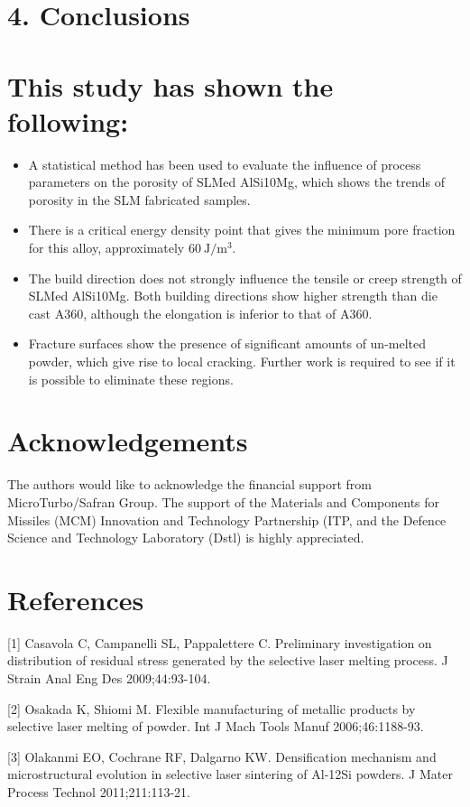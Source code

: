 \documentclass[10pt]{article}
\begin{document}
\section*{4. Conclusions}
\section*{This study has shown the following:}
\begin{itemize}
  \item A statistical method has been used to evaluate the influence of process parameters on the porosity of SLMed AlSi10Mg, which shows the trends of porosity in the SLM fabricated samples.
  \item There is a critical energy density point that gives the minimum pore fraction for this alloy, approximately $60 \mathrm{~J} / \mathrm{m}^{3}$.
  \item The build direction does not strongly influence the tensile or creep strength of SLMed AlSi10Mg. Both building directions show higher strength than die cast A360, although the elongation is inferior to that of A360.
  \item Fracture surfaces show the presence of significant amounts of un-melted powder, which give rise to local cracking. Further work is required to see if it is possible to eliminate these regions.
\end{itemize}

\section*{Acknowledgements}
The authors would like to acknowledge the financial support from MicroTurbo/Safran Group. The support of the Materials and Components for Missiles (MCM) Innovation and Technology Partnership (ITP, and the Defence Science and Technology Laboratory (Dstl) is highly appreciated.

\section*{References}
[1] Casavola C, Campanelli SL, Pappalettere C. Preliminary investigation on distribution of residual stress generated by the selective laser melting process. J Strain Anal Eng Des 2009;44:93-104.

[2] Osakada K, Shiomi M. Flexible manufacturing of metallic products by selective laser melting of powder. Int J Mach Tools Manuf 2006;46:1188-93.

[3] Olakanmi EO, Cochrane RF, Dalgarno KW. Densification mechanism and microstructural evolution in selective laser sintering of Al-12Si powders. J Mater Process Technol 2011;211:113-21.
\end{document}
